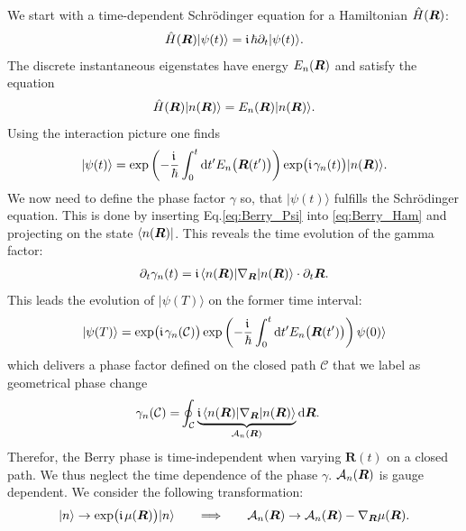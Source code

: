 \documentclass[../main]{subfiles}
\begin{document}
    We start with a time-dependent Schrödinger equation for a Hamiltonian $\hat{H}(\bm{R})$:
    \begin{align}\label{eq:Berry_Ham}
        \hat{H}(\bm{R}) |\psi(t)\rangle = \large\mathfrak{i}\hspace*{1.3pt}\normalsize\hbar \partial_t|\psi(t)\rangle.
    \end{align}
    The discrete instantaneous eigenstates have energy $E_n(\bm{R})$ and satisfy the equation
    \begin{align*}
        \hat{H}(\bm{R}) |n(\bm{R})\rangle = E_n(\bm{R}) |n(\bm{R})\rangle.
    \end{align*}
    Using the interaction picture one finds
    \begin{align}\label{eq:Berry_Psi}
        |\psi(t)\rangle = \exp\left(-\frac{\large\mathfrak{i}\hspace*{1.3pt}\normalsize}{\hbar} \int_{0}^{t} \mathrm{d} t' E_n\bigl(\bm{R}(t')\bigr)\right) \exp\bigl(\large\mathfrak{i}\hspace*{1.3pt}\normalsize \gamma_n(t)\bigr)|n(\bm{R})\rangle.
    \end{align}
    We now need to define the phase factor $\gamma$ so, that $ |\psi(t)\rangle$ fulfills the Schrödinger equation. This is done by inserting Eq.\ref{eq:Berry_Psi} into
    \ref{eq:Berry_Ham} and projecting on the state $\langle n(\bm{R})|$.  This reveals the time evolution of the gamma factor:
    \begin{align*}
        \partial_t \gamma_n(t) = \large\mathfrak{i}\hspace*{1.3pt}\normalsize \langle n(\bm{R}) | \nabla_{\bm{R}} | n (\bm{R})\rangle \cdot \partial_t \bm{R}.
    \end{align*}
    This leads the evolution of $|\psi(T)\rangle$ on the former time interval:
    \begin{align}\label{eq:Berry_PsiT}
        |\psi(T)\rangle = \exp\bigl(\large\mathfrak{i}\hspace*{1.3pt}\normalsize \gamma_n(\mathcal{C})\bigr) \exp\left(-\frac{\large\mathfrak{i}\hspace*{1.3pt}\normalsize}{\hbar} \int_{0}^{t} \mathrm{d} t' E_n\bigl(\bm{R}(t')\bigr)\right) \psi(0)\rangle
    \end{align}
    which delivers a phase factor defined on the closed path $\mathcal{C}$ that we label as geometrical phase change
    \begin{align}\label{eq:Berry_gammaC}
        \gamma_n(\mathcal{C}) =& \oint_{\mathcal{C}} \underbrace{\large\mathfrak{i}\hspace*{1.3pt}\normalsize \langle n(\bm{R}) | \nabla_{\bm{R}} | n (\bm{R})\rangle}_{\mathcal{A}_n(\bm{R})} \mathrm{d} \bm{R}.
    \end{align}
    Therefor, the Berry phase is time-independent when varying $\bm{R}(t)$ on a closed path. We thus neglect the time dependence of the phase $\gamma$.  $\mathcal{A}_n(\bm{R})$ is 
    gauge dependent. We consider the following transformation:
    \begin{align}\label{eq:Berry_gauge_A}
        |n\rangle \rightarrow \exp\bigl(\large\mathfrak{i}\hspace*{1.3pt}\normalsize \mu(\bm{R})\bigr)|n\rangle \hspace*{18pt}\Longrightarrow\hspace*{18pt}       \mathcal{A}_n(\bm{R}) \rightarrow  \mathcal{A}_n(\bm{R})  - \nabla_{\bm{R}} \mu(\bm{R}).
    \end{align}
\end{document}
